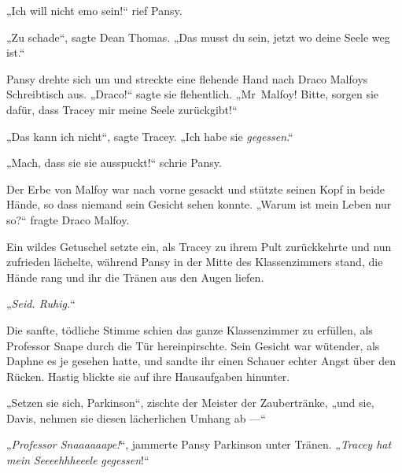 „Ich will nicht emo sein!“ rief Pansy.

„Zu schade“, sagte Dean Thomas.
„Das musst du sein, jetzt wo deine Seele weg ist.“

Pansy drehte sich um und streckte eine flehende Hand nach Draco Malfoys Schreibtisch aus.
„Draco!“ sagte sie flehentlich.
„Mr~Malfoy! Bitte, sorgen sie dafür, dass Tracey mir meine Seele zurückgibt!“

„Das kann ich nicht“, sagte Tracey.
„Ich habe sie \emph{gegessen}.“

„Mach, dass sie sie ausspuckt!“ schrie Pansy.

Der Erbe von Malfoy war nach vorne gesackt und stützte seinen Kopf in beide Hände, so dass niemand sein Gesicht sehen konnte.
„Warum ist mein Leben nur so?“ fragte Draco Malfoy.

Ein wildes Getuschel setzte ein, als Tracey zu ihrem Pult zurückkehrte und nun zufrieden lächelte, während Pansy in der Mitte des Klassenzimmers stand, die Hände rang und ihr die Tränen aus den Augen liefen.

„\emph{Seid. Ruhig.}“

Die sanfte, tödliche Stimme schien das ganze Klassenzimmer zu erfüllen, als Professor Snape durch die Tür hereinpirschte. Sein Gesicht war wütender, als Daphne es je gesehen hatte, und sandte ihr einen Schauer echter Angst über den Rücken. Hastig blickte sie auf ihre Hausaufgaben hinunter.

„Setzen sie sich, Parkinson“, zischte der Meister der Zaubertränke, „und sie, Davis, nehmen sie diesen lächerlichen Umhang ab —“

„\emph{Professor Snaaaaaape!}“, jammerte Pansy Parkinson unter Tränen.
„\emph{Tracey hat mein} \emph{Seeeehhheeele} \emph{gegessen}!“

